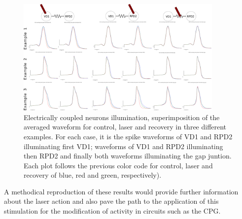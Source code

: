 \begin{figure}[hbt]
	\centering
	\includegraphics[width=0.9\textwidth]{img/laser/electrical/electrical_results_reduced.pdf}
    \caption{Electrically coupled neurons illumination, superimposition of the averaged waveform for control, laser and recovery in three different examples. For each case, it is the spike waveforms of VD1 and RPD2 illuminating first VD1; waveforms of VD1 and RPD2 illuminating then RPD2 and finally both waveforms illuminating the gap juntion. Each plot follows the previous color code for control, laser and recovery of blue, red and green, respectively).}
    \label{fig:electrical results}
\end{figure}


A methodical reproduction of these results would provide further information about the laser action and also pave the path to the application of this stimulation for the modification of activity in circuits such as the CPG. 

